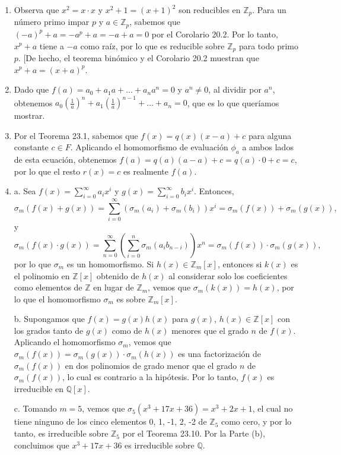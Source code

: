 \begin{enumerate}
	\item Observa que \(x^2 = x \cdot x\) y \(x^2 + 1 = (x + 1)^2\) son reducibles en \(\mathbb{Z}_p\). Para un número primo impar \(p\) y \(a \in \mathbb{Z}_p\), sabemos que \((-a)^p + a = -a^p + a = -a + a = 0\) por el Corolario 20.2. Por lo tanto, \(x^p + a\) tiene a \(-a\) como raíz, por lo que es reducible sobre \(\mathbb{Z}_p\) para todo primo \(p\). [De hecho, el teorema binómico y el Corolario 20.2 muestran que \(x^p + a = (x + a)^p\). 
	
	\item Dado que \(f(a) = a_0 + a_1a + \ldots + a_na^n = 0\) y \(a^n \neq 0\), al dividir por \(a^n\), obtenemos \(a_0 \left( \frac{1}{a} \right)^n + a_1 \left( \frac{1}{a} \right)^{n-1} + \ldots + a_n = 0\), que es lo que queríamos mostrar.
	
	\item Por el Teorema 23.1, sabemos que \(f(x) = q(x)(x - a) + c\) para alguna constante \(c \in F\). Aplicando el homomorfismo de evaluación \(\phi_a\) a ambos lados de esta ecuación, obtenemos \(f(a) = q(a)(a - a) + c = q(a) \cdot 0 + c = c\), por lo que el resto \(r(x) = c\) es realmente \(f(a)\).
	
	\item 
	
	a. Sea \(f(x) = \sum_{i=0}^{\infty} a_i x^i\) y \(g(x) = \sum_{i=0}^{\infty} b_i x^i\). Entonces,
	\[
	\sigma_m(f(x) + g(x)) = \sum_{i=0}^{\infty} (\sigma_m(a_i) + \sigma_m(b_i))x^i = \sigma_m(f(x)) + \sigma_m(g(x)),
	\]
	y
	\[
	\sigma_m(f(x) \cdot g(x)) = \sum_{n=0}^{\infty} \left( \sum_{i=0}^{n} \sigma_m(a_i b_{n-i}) \right) x^n = \sigma_m(f(x)) \cdot \sigma_m(g(x)),
	\]
	por lo que \(\sigma_m\) es un homomorfismo. Si \(h(x) \in \mathbb{Z}_m[x]\), entonces si \(k(x)\) es el polinomio en \(\mathbb{Z}[x]\) obtenido de \(h(x)\) al considerar solo los coeficientes como elementos de \(\mathbb{Z}\) en lugar de \(\mathbb{Z}_m\), vemos que \(\sigma_m(k(x)) = h(x)\), por lo que el homomorfismo \(\sigma_m\) es sobre \(\mathbb{Z}_m[x]\).
	
	b. Supongamos que \(f(x) = g(x)h(x)\) para \(g(x)\), \(h(x) \in \mathbb{Z}[x]\) con los grados tanto de \(g(x)\) como de \(h(x)\) menores que el grado \(n\) de \(f(x)\). Aplicando el homomorfismo \(\sigma_m\), vemos que \(\sigma_m(f(x)) = \sigma_m(g(x)) \cdot \sigma_m(h(x))\) es una factorización de \(\sigma_m(f(x))\) en dos polinomios de grado menor que el grado \(n\) de \(\sigma_m(f(x))\), lo cual es contrario a la hipótesis. Por lo tanto, \(f(x)\) es irreducible en \(\mathbb{Q}[x]\).
	
	c. Tomando \(m = 5\), vemos que \(\sigma_5(x^3 + 17x + 36) = x^3 + 2x + 1\), el cual no tiene ninguno de los cinco elementos 0, 1, -1, 2, -2 de \(\mathbb{Z}_5\) como cero, y por lo tanto, es irreducible sobre \(\mathbb{Z}_5\) por el Teorema 23.10. Por la Parte (b), concluimos que \(x^3 + 17x + 36\) es irreducible sobre \(\mathbb{Q}\).
	
\end{enumerate}
